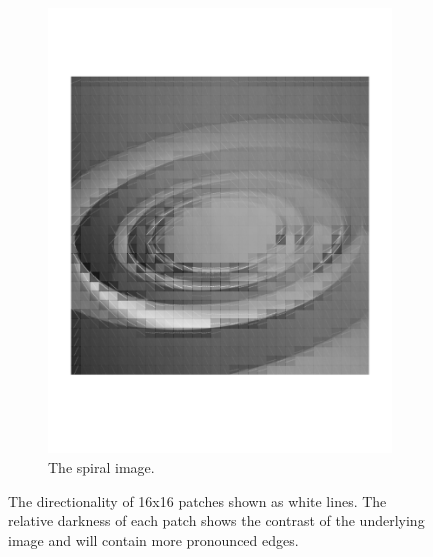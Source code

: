 \begin{figure}[h]
\begin{subfigure}[b]{0.47\textwidth}
		\includegraphics[trim=2cm 5cm 2cm 5cm, clip=true, width=\textwidth]{figures/directional_spiral}
		\caption{The spiral image.}
		\label{fig:spiral}
	\end{subfigure}

	\caption{The directionality of 16x16 patches shown as white lines. The relative darkness of each patch shows the contrast of the underlying image and will contain more pronounced edges.}
	\label{fig:directionality}
\end{figure}